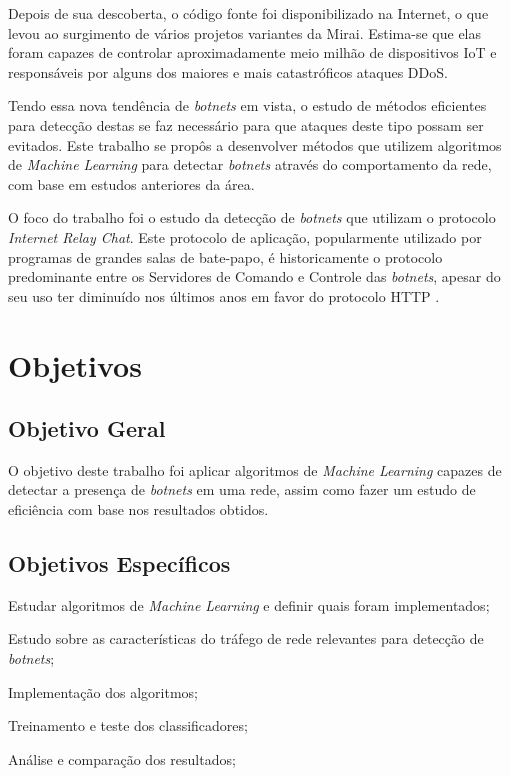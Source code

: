 Depois de sua descoberta, o código fonte foi disponibilizado na Internet, o que levou ao surgimento de vários projetos variantes da Mirai. Estima-se que elas foram capazes de controlar aproximadamente meio milhão de dispositivos IoT e responsáveis por alguns dos maiores e mais catastróficos ataques DDoS. \cite{mliot}

Tendo essa nova tendência de \textit{botnets} em vista, o estudo de métodos eficientes para detecção destas se faz necessário para que ataques deste tipo possam ser evitados. Este trabalho se propôs a desenvolver métodos que utilizem algoritmos de \textit{Machine Learning} para detectar \textit{botnets} através do comportamento da rede, com base em estudos anteriores da área. 

O foco do trabalho foi o estudo da detecção de \textit{botnets} que utilizam o protocolo \textit{Internet Relay Chat}. Este protocolo de aplicação, popularmente utilizado por programas de grandes salas de bate-papo, é historicamente o protocolo predominante entre os Servidores de Comando e Controle das \textit{botnets}, apesar do seu uso ter diminuído nos últimos anos em favor do protocolo HTTP \cite{logregbot}. 

\section{Objetivos}
\label{i.objetivos}

\subsection{Objetivo Geral}
\label{i.objetivo-geral}

O objetivo deste trabalho foi aplicar algoritmos de \textit{Machine Learning} capazes de detectar a presença de \textit{botnets} em uma rede, assim como fazer um estudo de eficiência com base nos resultados obtidos.

\subsection{Objetivos Específicos}
\label{i.objetivos-especificos}

\begin{alineas}

\item Estudar algoritmos de \textit{Machine Learning} e definir quais foram implementados;

\item Estudo sobre as características do tráfego de rede relevantes para detecção de \textit{botnets};

\item Implementação dos algoritmos;

\item Treinamento e teste dos classificadores;

\item Análise e comparação dos resultados;

\end{alineas}


